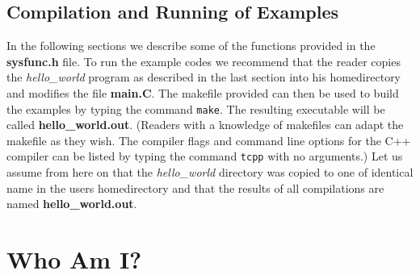 \subsection{Compilation and Running of Examples}
In the following sections we describe some of the functions provided 
in the {\bf sysfunc.h} file. To run the example codes we recommend that
the reader copies the {\em hello\_world} program as described in the last
section into his homedirectory and modifies the file {\bf main.C}. The makefile
provided can then be used to build the examples by typing the command {\tt make}. The resulting executable will be called {\bf hello\_world.out}. (Readers
with a knowledge of makefiles can adapt the makefile as they wish. The compiler
flags and command line options for the C++ compiler can be listed by typing
the command {\tt tcpp} with no arguments.) Let us
assume from here on that the {\em hello\_world} directory was copied to one
of identical name in the users homedirectory and that the results of all
compilations are named {\bf hello\_world.out}.

\section{Who Am I?}
